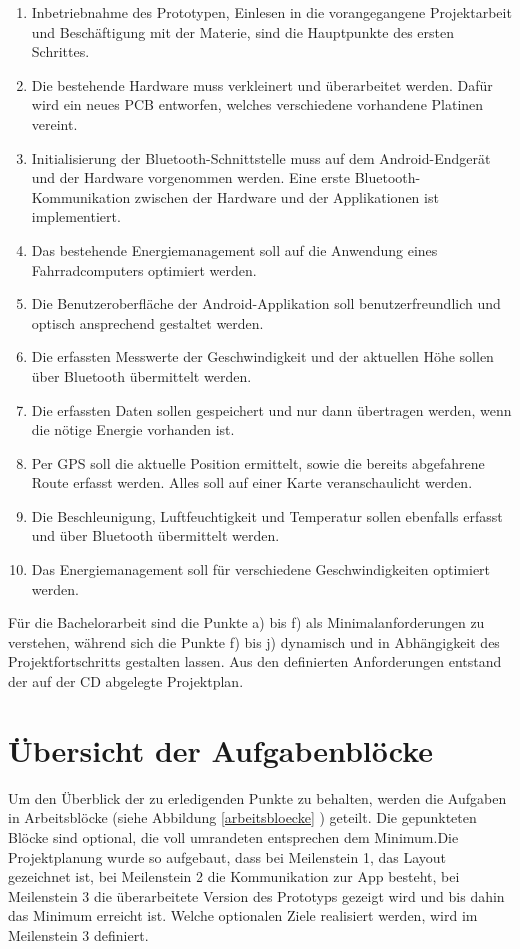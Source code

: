 \begin{enumerate} 

\item Inbetriebnahme des Prototypen, Einlesen in die vorangegangene Projektarbeit und Beschäftigung mit der Materie, sind die Hauptpunkte des ersten Schrittes.
\item Die bestehende Hardware muss verkleinert und überarbeitet werden. Dafür wird ein neues PCB entworfen, welches verschiedene vorhandene Platinen vereint.
\item Initialisierung der Bluetooth-Schnittstelle muss auf dem Android-Endgerät und der Hardware vorgenommen werden. Eine erste Bluetooth-Kommunikation zwischen der Hardware und der Applikationen ist implementiert.
\item Das bestehende Energiemanagement soll auf die Anwendung eines Fahrradcomputers optimiert werden.
\item Die Benutzeroberfläche der Android-Applikation soll benutzerfreundlich und optisch ansprechend gestaltet werden.
\item Die erfassten Messwerte der Geschwindigkeit und der aktuellen Höhe sollen über Bluetooth übermittelt werden.
\item	Die erfassten Daten sollen gespeichert und nur dann übertragen werden, wenn die nötige Energie vorhanden ist.
\item	Per GPS soll die aktuelle Position ermittelt, sowie die bereits abgefahrene Route erfasst werden. Alles soll auf einer Karte veranschaulicht werden.
\item	Die Beschleunigung, Luftfeuchtigkeit und Temperatur sollen ebenfalls erfasst und über Bluetooth übermittelt werden.
\item	Das Energiemanagement soll für verschiedene Geschwindigkeiten optimiert werden.
\end{enumerate}

Für die Bachelorarbeit sind die Punkte a) bis f) als Minimalanforderungen zu verstehen, während sich die Punkte f) bis j) dynamisch und in Abhängigkeit des Projektfortschritts gestalten lassen. Aus den definierten Anforderungen entstand der auf der CD abgelegte Projektplan.

\section{Übersicht der Aufgabenblöcke}

Um den Überblick der zu erledigenden Punkte zu behalten, werden die Aufgaben in Arbeitsblöcke (siehe Abbildung \ref{arbeitsbloecke} ) geteilt. Die gepunkteten Blöcke sind optional, die voll umrandeten entsprechen dem Minimum.Die Projektplanung wurde so aufgebaut, dass bei Meilenstein 1, das Layout gezeichnet ist, bei Meilenstein 2 die Kommunikation zur App besteht, bei Meilenstein 3 die überarbeitete Version des Prototyps gezeigt wird und bis dahin das Minimum erreicht ist. Welche optionalen Ziele realisiert werden, wird im Meilenstein 3 definiert.

